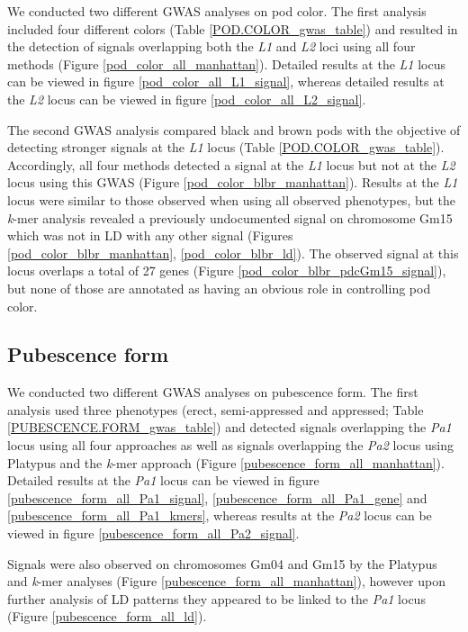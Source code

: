 We conducted two different GWAS analyses on pod color. The first analysis included four
different colors (Table \ref{POD.COLOR_gwas_table}) and resulted in the
detection of signals overlapping both the \emph{L1} and \emph{L2} loci using all
four methods (Figure \ref{pod_color_all_manhattan}). Detailed results at the
\textit{L1} locus can be viewed in figure \ref{pod_color_all_L1_signal},
whereas detailed results at the \textit{L2} locus can be viewed in figure
\ref{pod_color_all_L2_signal}.

The second GWAS analysis compared black and brown pods with the objective of detecting stronger
signals at the \emph{L1} locus (Table
\ref{POD.COLOR_gwas_table}).  Accordingly, all four methods detected a signal
at the \emph{L1} locus but not at the \emph{L2} locus using this GWAS (Figure
\ref{pod_color_blbr_manhattan}).  Results at the \emph{L1} locus were similar
to those observed when using all observed phenotypes, but the \emph{k}-mer
analysis revealed a previously undocumented signal on chromosome Gm15 which was
not in LD with any other signal (Figures \ref{pod_color_blbr_manhattan},
\ref{pod_color_blbr_ld}). The observed signal at this locus overlaps a total of
27 genes (Figure \ref{pod_color_blbr_pdcGm15_signal}), but none of those are
annotated as having an obvious role in controlling pod color.

\subsection*{Pubescence form}
\label{sv-gwas-pubesence-form}

We conducted two different GWAS analyses on pubescence form. The first analysis used three
phenotypes (erect, semi-appressed and appressed; Table
\ref{PUBESCENCE.FORM_gwas_table}) and detected signals overlapping the
\emph{Pa1} locus using all four approaches as well as signals overlapping the
\emph{Pa2} locus using Platypus and the \emph{k}-mer approach (Figure
\ref{pubescence_form_all_manhattan}). Detailed results at the \textit{Pa1} locus
can be viewed in figure \ref{pubescence_form_all_Pa1_signal},
\ref{pubescence_form_all_Pa1_gene} and \ref{pubescence_form_all_Pa1_kmers},
whereas results at the \textit{Pa2} locus can be viewed in figure
\ref{pubescence_form_all_Pa2_signal}.

Signals were also observed on chromosomes Gm04 and Gm15 by the Platypus and
\emph{k}-mer analyses (Figure \ref{pubescence_form_all_manhattan}), however
upon further analysis of LD patterns they appeared to be linked to the
\emph{Pa1} locus (Figure \ref{pubescence_form_all_ld}).

